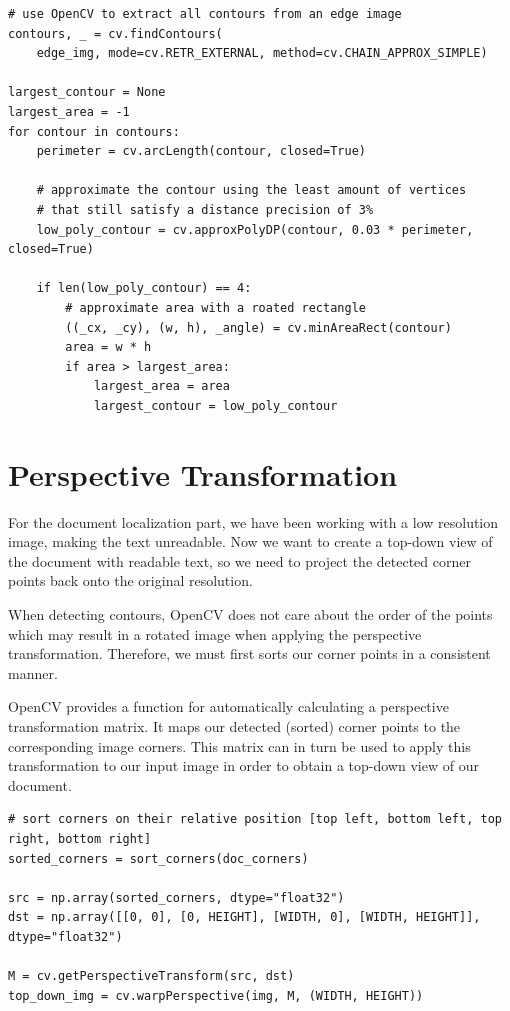 \documentclass[bibliography=totoc]{scrartcl}
\begin{document}
	\lstset{language=Python}
	\lstset{frame=lines}
	\lstset{basicstyle=\footnotesize}
	\begin{lstlisting}
# use OpenCV to extract all contours from an edge image
contours, _ = cv.findContours(
	edge_img, mode=cv.RETR_EXTERNAL, method=cv.CHAIN_APPROX_SIMPLE)

largest_contour = None
largest_area = -1
for contour in contours:
	perimeter = cv.arcLength(contour, closed=True)
	
	# approximate the contour using the least amount of vertices 
	# that still satisfy a distance precision of 3%
	low_poly_contour = cv.approxPolyDP(contour, 0.03 * perimeter, closed=True)

	if len(low_poly_contour) == 4:
		# approximate area with a roated rectangle
		((_cx, _cy), (w, h), _angle) = cv.minAreaRect(contour)
		area = w * h
		if area > largest_area:
			largest_area = area
			largest_contour = low_poly_contour
	\end{lstlisting}

	
	\section{Perspective Transformation}
	For the document localization part, we have been working with a low resolution image, making the text unreadable.
	Now we want to create a top-down view of the document with readable text, so we need to project the detected corner points back onto the original resolution. 

	When detecting contours, OpenCV does not care about the order of the points which may result in a rotated image when applying the perspective transformation.
	Therefore, we must first sorts our corner points in a consistent manner.

	OpenCV provides a function for automatically calculating a perspective transformation matrix. 
	It maps our detected (sorted) corner points to the corresponding image corners.
	This matrix can in turn be used to apply this transformation to our input image in order to obtain a top-down view of our document.\\

	\lstset{language=Python}
	\lstset{frame=lines}
	\lstset{basicstyle=\footnotesize}
	\begin{lstlisting}
# sort corners on their relative position [top left, bottom left, top right, bottom right]
sorted_corners = sort_corners(doc_corners)

src = np.array(sorted_corners, dtype="float32")
dst = np.array([[0, 0], [0, HEIGHT], [WIDTH, 0], [WIDTH, HEIGHT]], dtype="float32")

M = cv.getPerspectiveTransform(src, dst)
top_down_img = cv.warpPerspective(img, M, (WIDTH, HEIGHT))
	\end{lstlisting}
    
\end{document}
